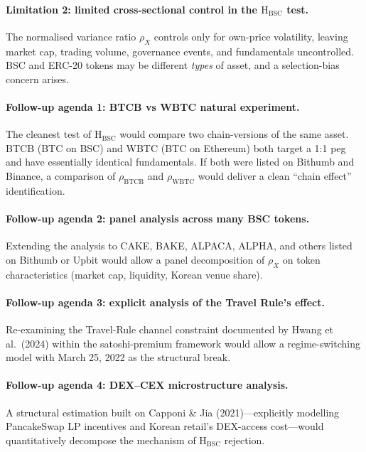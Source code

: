 \documentclass[11pt,a4paper]{article}
\begin{document}
\paragraph{Limitation 2: limited cross-sectional control in the $\mathrm{H_{BSC}}$ test.}
The normalised variance ratio $\rho_X$ controls only for own-price volatility, leaving market cap,
trading volume, governance events, and fundamentals uncontrolled. BSC and ERC-20 tokens may be
different \emph{types} of asset, and a selection-bias concern arises.

\paragraph{Follow-up agenda 1: BTCB vs WBTC natural experiment.}
The cleanest test of $\mathrm{H_{BSC}}$ would compare two chain-versions of the same asset. BTCB
(BTC on BSC) and WBTC (BTC on Ethereum) both target a 1:1 peg and have essentially identical
fundamentals. If both were listed on Bithumb and Binance, a comparison of $\rho_{\text{BTCB}}$ and
$\rho_{\text{WBTC}}$ would deliver a clean ``chain effect'' identification.

\paragraph{Follow-up agenda 2: panel analysis across many BSC tokens.}
Extending the analysis to CAKE, BAKE, ALPACA, ALPHA, and others listed on Bithumb or Upbit would
allow a panel decomposition of $\rho_X$ on token characteristics (market cap, liquidity, Korean
venue share).

\paragraph{Follow-up agenda 3: explicit analysis of the Travel Rule's effect.}
Re-examining the Travel-Rule channel constraint documented by Hwang et al.\ (2024) within the
satoshi-premium framework would allow a regime-switching model with March 25, 2022 as the
structural break.

\paragraph{Follow-up agenda 4: DEX--CEX microstructure analysis.}
A structural estimation built on Capponi \& Jia (2021)---explicitly modelling PancakeSwap LP
incentives and Korean retail's DEX-access cost---would quantitatively decompose the mechanism of
$\mathrm{H_{BSC}}$ rejection.
\end{document}
